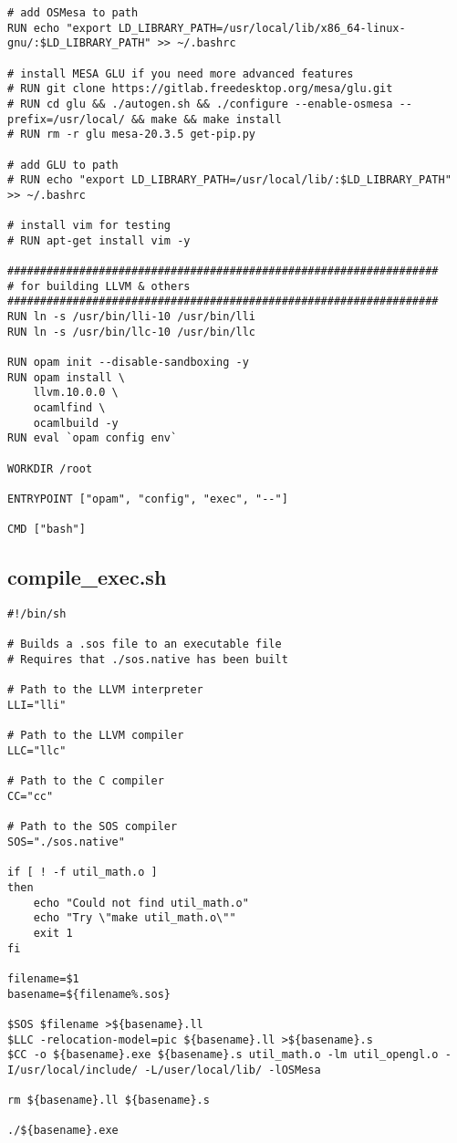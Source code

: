 \documentclass[main.tex]{subfiles}
\begin{document}
\begin{lstlisting}
# add OSMesa to path
RUN echo "export LD_LIBRARY_PATH=/usr/local/lib/x86_64-linux-gnu/:$LD_LIBRARY_PATH" >> ~/.bashrc

# install MESA GLU if you need more advanced features
# RUN git clone https://gitlab.freedesktop.org/mesa/glu.git
# RUN cd glu && ./autogen.sh && ./configure --enable-osmesa --prefix=/usr/local/ && make && make install
# RUN rm -r glu mesa-20.3.5 get-pip.py

# add GLU to path
# RUN echo "export LD_LIBRARY_PATH=/usr/local/lib/:$LD_LIBRARY_PATH" >> ~/.bashrc

# install vim for testing
# RUN apt-get install vim -y

##################################################################
# for building LLVM & others
##################################################################
RUN ln -s /usr/bin/lli-10 /usr/bin/lli
RUN ln -s /usr/bin/llc-10 /usr/bin/llc

RUN opam init --disable-sandboxing -y
RUN opam install \
    llvm.10.0.0 \
    ocamlfind \
    ocamlbuild -y
RUN eval `opam config env`

WORKDIR /root

ENTRYPOINT ["opam", "config", "exec", "--"]

CMD ["bash"]
\end{lstlisting}

\subsection{compile\_exec.sh}
\begin{lstlisting}
#!/bin/sh

# Builds a .sos file to an executable file
# Requires that ./sos.native has been built

# Path to the LLVM interpreter
LLI="lli"

# Path to the LLVM compiler
LLC="llc"

# Path to the C compiler
CC="cc"

# Path to the SOS compiler
SOS="./sos.native"

if [ ! -f util_math.o ]
then
    echo "Could not find util_math.o"
    echo "Try \"make util_math.o\""
    exit 1
fi

filename=$1
basename=${filename%.sos}

$SOS $filename >${basename}.ll
$LLC -relocation-model=pic ${basename}.ll >${basename}.s
$CC -o ${basename}.exe ${basename}.s util_math.o -lm util_opengl.o -I/usr/local/include/ -L/user/local/lib/ -lOSMesa

rm ${basename}.ll ${basename}.s

./${basename}.exe
\end{lstlisting}
\end{document}
